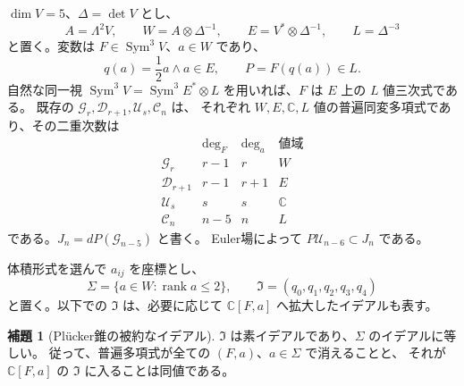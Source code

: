 \documentclass[a4paper,11pt]{ltjsarticle}
\theoremstyle{definition}
\newtheorem{lemma}[theorem]{補題}
\begin{document}
$\dim V=5$、$\Delta=\det V$ とし、
\[
 A=\Lambda^2V,\qquad W=A\otimes\Delta^{-1},\qquad
 E=V^*\otimes\Delta^{-1},\qquad L=\Delta^{-3}
\]
と置く。変数は $F\in\operatorname{Sym}^3V$、$a\in W$ であり、
\[
 q(a)=\frac12a\wedge a\in E,\qquad P=F(q(a))\in L.
\]
自然な同一視
$\operatorname{Sym}^3V=\operatorname{Sym}^3E^*\otimes L$
を用いれば、$F$ は $E$ 上の $L$ 値三次式である。
既存の $\mathcal G_r,\mathcal D_{r+1},\mathcal U_s,\mathcal C_n$ は、
それぞれ $W,E,\mathbb C,L$ 値の普遍同変多項式であり、その二重次数は
\[
\begin{array}{c|cc|c}
 &\deg_F&\deg_a&\text{値域}\\\hline
 \mathcal G_r&r-1&r&W\\
 \mathcal D_{r+1}&r-1&r+1&E\\
 \mathcal U_s&s&s&\mathbb C\\
 \mathcal C_n&n-5&n&L
\end{array}
\]
である。$J_n=dP(\mathcal G_{n-5})$ と書く。
Euler場によって $P\mathcal U_{n-6}\subset J_n$ である。

体積形式を選んで $a_{ij}$ を座標とし、
\[
 \Sigma=\{a\in W:\operatorname{rank}a\le2\},\qquad
 \mathfrak I=(q_0,q_1,q_2,q_3,q_4)
\]
と置く。以下での $\mathfrak I$ は、必要に応じて
$\mathbb C[F,a]$ へ拡大したイデアルも表す。

\begin{lemma}[Pl\"ucker錐の被約なイデアル]
\label{lem:v16-plucker-prime-ideal}
$\mathfrak I$ は素イデアルであり、$\Sigma$ のイデアルに等しい。
従って、普遍多項式が全ての $(F,a)$、$a\in\Sigma$ で消えることと、
それが $\mathbb C[F,a]$ の $\mathfrak I$ に入ることは同値である。
\end{lemma}
\end{document}
